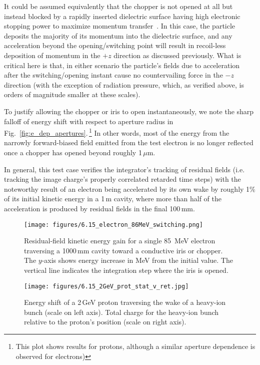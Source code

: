 \documentclass[reprint,
               amsmath,amssymb,nofootinbib, aps%
              ]{revtex4-2}
\begin{document}
It could be assumed equivalently that the chopper is not opened at all but instead blocked by a rapidly inserted dielectric surface having high electronic stopping power to maximize momentum transfer~\cite{datz_stoppingpow_1996,lindhard_stopping_1996}. In this case, the particle deposits the majority of its momentum into the dielectric surface, and any acceleration beyond the opening/switching point will result in recoil-less deposition of momentum in the $+z$ direction as discussed previously. What is critical here is that, in either scenario the particle's fields due to acceleration after the switching/opening instant cause no countervailing force in the $-z$ direction (with the exception of radiation pressure, which, as verified above, is orders of magnitude smaller at these scales).

To justify allowing the chopper or iris to open instantaneously, we note the sharp falloff of energy shift with respect to aperture radius in Fig.~\ref{fig:e_dep_apertures}.\,\footnote{This plot shows results for protons, although a similar aperture dependence is observed for electrons)} In other words, most of the energy from the narrowly forward-biased field emitted from the test electron is no longer reflected once a chopper has opened beyond roughly 1\,{$\mu$}m.

In general, this test case verifies the integrator's tracking of residual fields (i.e. tracking the image charge's properly correlated retarded time steps) with the noteworthy result of an electron being accelerated by its own wake by roughly 1\% of its initial kinetic energy in a 1\,m cavity, where more than half of the acceleration is produced by residual fields in the final 100\,mm.

\begin{figure}[htp!]
    \centering
    \texttt{[image: figures/6.15\_electron\_86MeV\_switching.png]}
    \caption{Residual-field kinetic energy gain for a single 85~MeV electron traversing a 1000\,mm cavity toward a conductive iris or chopper. The $y$-axis shows energy increase in MeV from the initial value. The vertical line indicates the integration step where the iris is opened.}
\label{fig:mom_switch_85MeV_elec}
\end{figure}

\begin{figure}[ht!]
    \centering
    \texttt{[image: figures/6.15\_2GeV\_prot\_stat\_v\_ret.jpg]}
    \caption{ Energy shift of a 2\,GeV proton traversing the wake of a heavy-ion bunch (scale on left axis). Total charge for the heavy-ion bunch relative to the proton's position (scale on right axis).}
\label{fig:real_bunch_accel_stat_ret}
\end{figure}
\end{document}
